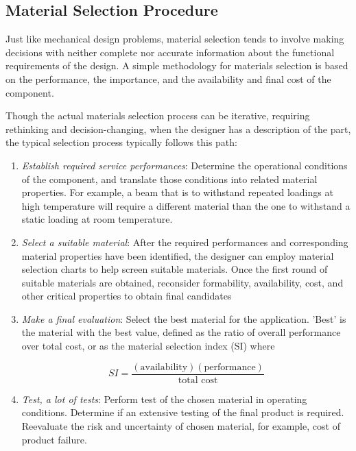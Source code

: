 \documentclass[a4paper,openany,12pt]{book}
\begin{document}
\subsection{Material Selection Procedure}
\label{material-selection-procedure}
Just like mechanical design problems, material selection tends to
involve making decisions with neither complete nor accurate information
about the functional requirements of the design. A simple methodology
for materials selection is based on the performance, the importance, and
the availability and final cost of the component.

Though the actual materials selection process can be iterative,
requiring rethinking and decision-changing, when the designer has a
description of the part, the typical selection process typically follows
this path:

\begin{enumerate}
\item \emph{Establish required service performances}: Determine the operational
conditions of the component, and translate those conditions into
related material properties. For example, a beam that is to withstand
repeated loadings at high temperature will require a different
material than the one to withstand a static loading at room
temperature.

\item \emph{Select a suitable material}: After the required performances and
corresponding material properties have been identified, the designer
can employ material selection charts to help screen suitable
materials. Once the first round of suitable materials are obtained,
reconsider formability, availability, cost, and other critical
properties to obtain final candidates

\item \emph{Make a final evaluation}: Select the best material for the
application. 'Best' is the material with the best value, defined as
the ratio of overall performance over total cost, or as the material
selection index (SI) where

$$SI = \frac{(\text{availability})(\text{performance})}{\text{total cost}}$$

\item \emph{Test, a lot of tests}: Perform test of the chosen material in
operating conditions. Determine if an extensive testing of the final
product is required. Reevaluate the risk and uncertainty of chosen
material, for example, cost of product failure.
\end{enumerate}
\end{document}
